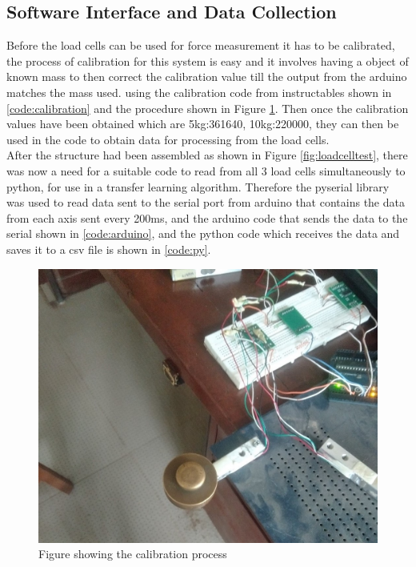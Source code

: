 \subsection{Software Interface and Data Collection}
Before the load cells can be used for force measurement it has to be calibrated, the process of calibration for this system is easy and it involves having a object of known mass to then correct the calibration value till the output from the arduino matches the mass used. using the calibration code from instructables \cite{Degraw2017} shown in \ref{code:calibration} and the procedure shown in Figure \ref{fig:calibration}. Then once the calibration values have been obtained which are 5kg:361640, 10kg:220000, they can then be used in the code to obtain data for processing from the load cells.\\
After the structure had been assembled as shown in Figure \ref{fig:loadcelltest}, there was now a need for a suitable code to read from all 3 load cells simultaneously to python, for use in a transfer learning algorithm. Therefore the pyserial library was used to read data sent to the serial port from arduino that contains the data from each axis sent every 200ms, and the arduino code that sends the data to the serial shown in \ref{code:arduino}, and the python code which receives the data and saves it to a csv file is shown in \ref{code:py}.

\begin{figure}[p]%
	\centering
	\includegraphics[width=15cm]{figures/ch3/calibration}
	\caption{Figure showing the calibration process}
	\label{fig:calibration}
\end{figure}

